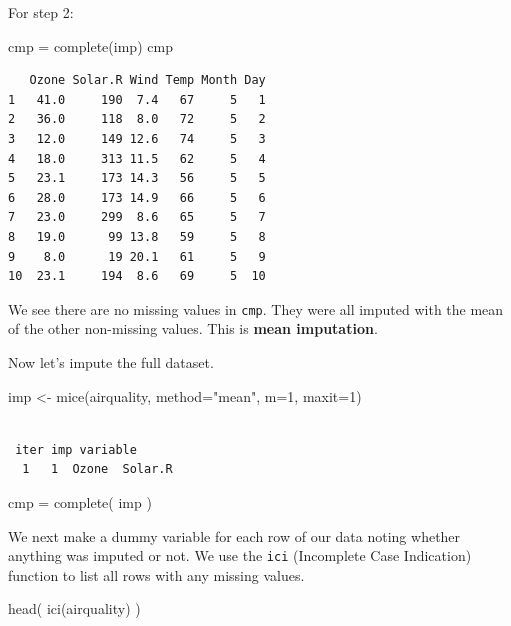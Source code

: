 \documentclass[
  letterpaper,
  DIV=11,
  numbers=noendperiod]{scrreprt}
\newenvironment{Shaded}{\begin{snugshade}}{\end{snugshade}}
\newcommand{\AttributeTok}[1]{\textcolor[rgb]{0.49,0.56,0.16}{#1}}
\newcommand{\DecValTok}[1]{\textcolor[rgb]{0.25,0.63,0.44}{#1}}
\newcommand{\FunctionTok}[1]{\textcolor[rgb]{0.02,0.16,0.49}{#1}}
\newcommand{\NormalTok}[1]{\textcolor[rgb]{0.00,0.44,0.13}{#1}}
\newcommand{\OtherTok}[1]{\textcolor[rgb]{0.00,0.44,0.13}{#1}}
\newcommand{\StringTok}[1]{\textcolor[rgb]{0.25,0.44,0.63}{#1}}
\begin{document}
For step 2:

\begin{Shaded}
\begin{Highlighting}[]
\NormalTok{  cmp }\OtherTok{=} \FunctionTok{complete}\NormalTok{(imp)}
\NormalTok{  cmp}
\end{Highlighting}
\end{Shaded}

\begin{verbatim}
   Ozone Solar.R Wind Temp Month Day
1   41.0     190  7.4   67     5   1
2   36.0     118  8.0   72     5   2
3   12.0     149 12.6   74     5   3
4   18.0     313 11.5   62     5   4
5   23.1     173 14.3   56     5   5
6   28.0     173 14.9   66     5   6
7   23.0     299  8.6   65     5   7
8   19.0      99 13.8   59     5   8
9    8.0      19 20.1   61     5   9
10  23.1     194  8.6   69     5  10
\end{verbatim}

We see there are no missing values in \texttt{cmp}. They were all
imputed with the mean of the other non-missing values. This is
\textbf{mean imputation}.

Now let's impute the full dataset.

\begin{Shaded}
\begin{Highlighting}[]
\NormalTok{  imp }\OtherTok{\textless{}{-}} \FunctionTok{mice}\NormalTok{(airquality, }\AttributeTok{method=}\StringTok{"mean"}\NormalTok{, }\AttributeTok{m=}\DecValTok{1}\NormalTok{, }\AttributeTok{maxit=}\DecValTok{1}\NormalTok{)}
\end{Highlighting}
\end{Shaded}

\begin{verbatim}

 iter imp variable
  1   1  Ozone  Solar.R
\end{verbatim}

\begin{Shaded}
\begin{Highlighting}[]
\NormalTok{  cmp }\OtherTok{=} \FunctionTok{complete}\NormalTok{( imp )}
\end{Highlighting}
\end{Shaded}

We next make a dummy variable for each row of our data noting whether
anything was imputed or not. We use the \texttt{ici} (Incomplete Case
Indication) function to list all rows with any missing values.

\begin{Shaded}
\begin{Highlighting}[]
  \FunctionTok{head}\NormalTok{( }\FunctionTok{ici}\NormalTok{(airquality) )}
\end{Highlighting}
\end{Shaded}
\end{document}
